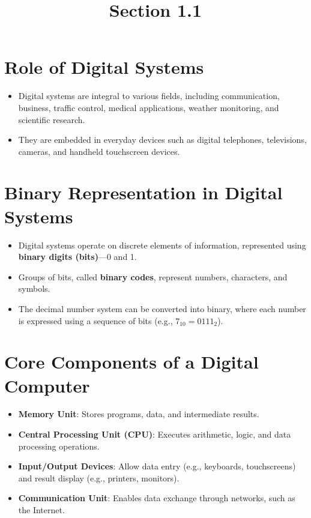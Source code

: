 \documentclass{article}
\begin{document}
\title{Section 1.1}
\author{}
\date{}
\maketitle

\section{Role of Digital Systems}
\begin{itemize}
    \item Digital systems are integral to various fields, including communication, business, traffic control, medical applications, weather monitoring, and scientific research.
    \item They are embedded in everyday devices such as digital telephones, televisions, cameras, and handheld touchscreen devices.
\end{itemize}

\section{Binary Representation in Digital Systems}
\begin{itemize}
    \item Digital systems operate on discrete elements of information, represented using \textbf{binary digits (bits)}—0 and 1.
    \item Groups of bits, called \textbf{binary codes}, represent numbers, characters, and symbols.
    \item The decimal number system can be converted into binary, where each number is expressed using a sequence of bits (e.g., $7_{10} = 0111_2$).
\end{itemize}

\section{Core Components of a Digital Computer}
\begin{itemize}
    \item \textbf{Memory Unit}: Stores programs, data, and intermediate results.
    \item \textbf{Central Processing Unit (CPU)}: Executes arithmetic, logic, and data processing operations.
    \item \textbf{Input/Output Devices}: Allow data entry (e.g., keyboards, touchscreens) and result display (e.g., printers, monitors).
    \item \textbf{Communication Unit}: Enables data exchange through networks, such as the Internet.
\end{itemize}
\end{document}
